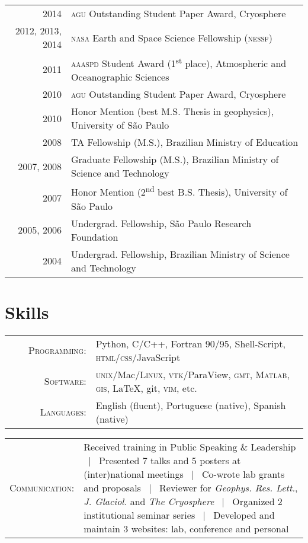 \documentclass[a4paper,11pt]{article}
\begin{document}
\begin{tabular}{rl}
2014 & \textsc{agu} Outstanding Student Paper Award, Cryosphere\\
2012, 2013, 2014 & \textsc{nasa} Earth and Space Science Fellowship (\textsc{nessf})\\ 
2011 & \textsc{aaaspd} Student Award (1\textsuperscript{st} place), Atmospheric and Oceanographic Sciences\\
2010 & \textsc{agu} Outstanding Student Paper Award, Cryosphere\\
2010 & Honor Mention (best M.S. Thesis in geophysics), University of S\~ao Paulo\\
2008 & TA Fellowship (M.S.), Brazilian Ministry of Education\\
2007, 2008 & Graduate Fellowship (M.S.), Brazilian Ministry of Science and Technology\\
2007 & Honor Mention (2\textsuperscript{nd} best B.S. Thesis), University of S\~ao Paulo\\
2005, 2006 & Undergrad. Fellowship, S\~ao Paulo Research Foundation\\
2004 & Undergrad. Fellowship, Brazilian Ministry of Science and Technology
\end{tabular}


\section{Skills}

\begin{tabular}{rl}
\textsc{~~~~Programming:} & Python, C/C++, Fortran 90/95, Shell-Script, \textsc{html}/\textsc{css}/JavaScript\\
\textsc{Software:} & \textsc{unix}/Mac/\textsc{Linux}, \textsc{vtk}/ParaView, \textsc{gmt}, \textsc{Matlab}, \textsc{gis}, \LaTeX, git, \textsc{vim}, etc.\\
\textsc{Languages:} & English (fluent), Portuguese (native), Spanish (native)
\end{tabular}

\begin{tabular}{rp{12.4cm}}
\textsc{Communication:} & Received training in Public Speaking \& Leadership ~|~ Presented 7 talks and 5 posters at (inter)national meetings ~|~ Co-wrote lab grants and proposals ~|~ Reviewer for {\it Geophys. Res. Lett.}, {\it J. Glaciol.} and {\it The Cryosphere} ~|~ Organized 2 institutional seminar series ~|~ Developed and maintain 3 websites: lab, conference and personal
\end{tabular}
\end{document}
